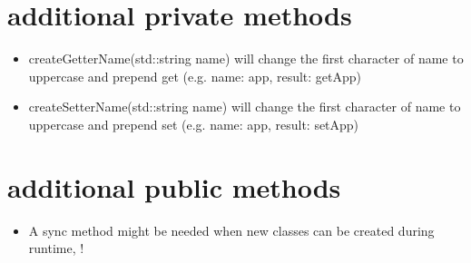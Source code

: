 \section{additional private methods}
\begin{itemize}
  \item createGetterName(std::string name) will change the first character of name to uppercase and prepend get (e.g. name: app, result: getApp)
  \item createSetterName(std::string name) will change the first character of name to uppercase and prepend set (e.g. name: app, result: setApp)
\end{itemize}
\section{additional public methods}
\begin{itemize}
  \item A sync method might be needed when new classes can be created during runtime, \color{red}{need to evaluate this}!
\end{itemize}
